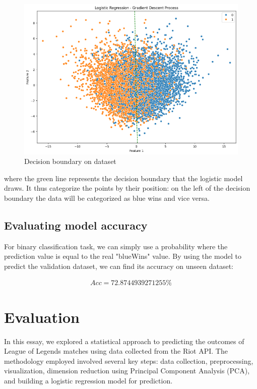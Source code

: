 \documentclass[stu,12pt,floatsintext]{apa7}
\begin{document}
\begin{figure}[h]
    \centering
    \includegraphics[width=0.8\linewidth]{images/decision-boundary.png}
    \caption{Decision boundary on dataset}
    \label{fig:enter-label}
\end{figure}

where the green line represents the decision boundary that the logistic model draws. It thus categorize the points by their position: on the left of the decision boundary the data will be categorized as blue wins and vice versa.

\subsection{Evaluating model accuracy}

For binary classification task, we can simply use a probability where the prediction value is equal to the real "blueWins" value. By using the model to predict the validation dataset, we can find its accuracy on unseen dataset:

\begin{gather}
    Acc=72.8744939271255\%
\end{gather}

\section{Evaluation}

In this essay, we explored a statistical approach to predicting the outcomes of League of Legends matches using data collected from the Riot API. The methodology employed involved several key steps: data collection, preprocessing, visualization, dimension reduction using Principal Component Analysis (PCA), and building a logistic regression model for prediction.
\end{document}
